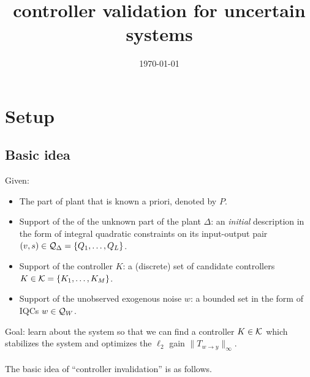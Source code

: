 \documentclass[11pt, onecolumn]{article}
\begin{document}
\title{controller validation for uncertain systems}
\date{\today}

\maketitle


\setcounter{page}{1}

\section{Setup}

\subsection{Basic idea}

Given:
\begin{itemize}
\item The part of plant that is known a priori, denoted by $P$.
\item Support of the of the unknown part of the plant $\Delta$: an {\em initial} description in the
  form of integral quadratic constraints on its input-output pair $(v,s)\in \mathcal Q_\Delta = \{Q_1,\dots, Q_L\}$.
\item Support of the controller $K$: a (discrete) set of candidate controllers $K \in \mathcal K = \{K_1,\dots,
  K_M\}$.
\item Support of the unobserved exogenous noise $w$: a bounded set in the form of IQCs $w\in \mathcal
  Q_{W}$.
\end{itemize}
Goal: learn about the system so that we can find a controller $K\in\mathcal K$ which stabilizes the
system and optimizes the $\ell_2$ gain $\|T_{w\to y}\|_{\infty}$.

\paragraph{}
The basic idea of ``controller invalidation'' is as follows.
\end{document}
